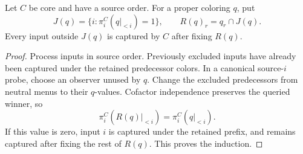 \begin{lemma}\label{core:lem:source-pattern-reduction}
Let $C$ be core and have a source order.
For a proper coloring $q$, put
\[
 J(q)=\{i:\pi_i^C(q|_{<i})=1\},\qquad R(q)_r=q_r\cap J(q).
\]
Every input outside $J(q)$ is captured by $C$ after fixing $R(q)$.
\end{lemma}
\begin{proof}
Process inputs in source order. Previously excluded inputs have already
been captured under the retained predecessor colors. In a canonical
source-$i$ probe, choose an observer unused by $q$. Change the excluded
predecessors from neutral menus to their $q$-values. Cofactor independence
preserves the queried winner, so
\[
 \pi_i^C(R(q)|_{<i})=\pi_i^C(q|_{<i}).
\]
If this value is zero, input $i$ is captured under the retained prefix,
and remains captured after fixing the rest of $R(q)$. This proves the
induction.
\end{proof}

